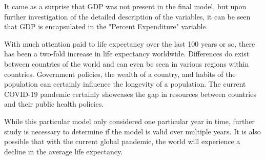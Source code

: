 It came as a surprise that GDP was not present in the final model, but upon further investigation of the detailed description of the variables, it can be seen that GDP is encapsulated in the "Percent Expenditure" variable. 

With much attention paid to life expectancy over the last 100 years or so, there has been a two-fold increase in life expectancy worldwide. Differences do exist between countries of the world and can even be seen in various regions within countries. Government policies, the wealth of a country, and habits of the population can certainly influence the longevity of a population. The current COVID-19 pandemic certainly showcases the gap in resources between countries and their public health policies. 

While this particular model only considered one particular year in time, further study is necessary to determine if the model is valid over multiple years. It is also possible that with the current global pandemic, the world will experience a decline in the average life expectancy.




